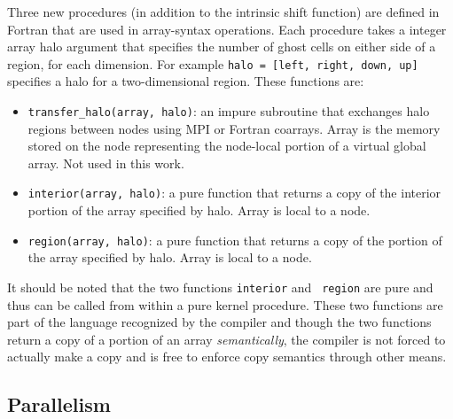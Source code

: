 Three new procedures (in addition to the intrinsic shift function) are
defined in Fortran that are used in array-syntax operations.  Each
procedure takes a integer array halo argument that specifies the
number of ghost cells on either side of a region, for each dimension.
For example {\tt halo = [left, right, down, up]} specifies a halo for
a two-dimensional region.  These functions are:

\begin{itemize}

\item {\tt transfer\_halo(array, halo)}: an impure subroutine that
  exchanges halo regions between nodes using MPI or Fortran
  coarrays. Array is the memory stored on the node representing the
  node-local portion of a virtual global array. Not used in this work.

\item {\tt interior(array, halo)}: a pure function that returns a copy of
  the interior portion of the array specified by halo. Array is
  local to a node.

\item {\tt region(array, halo)}: a pure function that returns a copy of
  the portion of the array specified by halo.  Array is local to a node.

\end{itemize}

It should be noted that the two functions {\tt interior} and {\tt
  region} are pure and thus can be called from within a pure kernel
procedure.  These two functions are part of the language recognized by
the compiler and though the two functions return a copy of a portion
of an array \emph{semantically}, the compiler is not forced to
actually make a copy and is free to enforce copy semantics through
other means.

\subsection{Parallelism}



